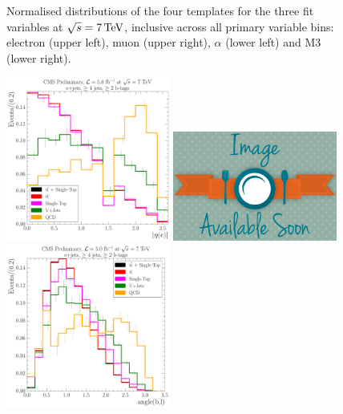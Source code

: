 \begin{figure}[hbtp]
	 \caption{Normalised distributions of the four templates for the three fit variables at $\sqrt{s}=7\,\text{Te\hspace{-.08em}V}$,
	 inclusive across all primary variable bins: electron \abseta (upper left), muon \abseta (upper right),
	 $\alpha$ (lower left) and M3 (lower right).}
     \label{fig:fit_variable_distributions_7TeV}
\end{figure}

\begin{figure}[hbtp]
    \centering
     \includegraphics[width=0.48\textwidth]{Chapters/04_Analysis/04b_XSections/images/7TeV/fit_variables/MET/electron_absolute_eta/MET_inclusive_electron_absolute_eta_2orMoreBtags_templates.pdf}\hfill
     \includegraphics[width=0.48\textwidth]{Chapters/04_Analysis/04b_XSections/images/placeholder.png}\hfill
     \includegraphics[width=0.48\textwidth]{Chapters/04_Analysis/04b_XSections/images/7TeV/fit_variables/MET/angle_bl/MET_inclusive_angle_bl_2orMoreBtags_templates.pdf}\hfill

\end{figure}

